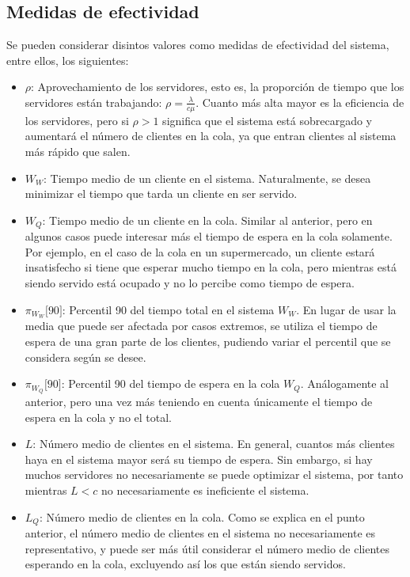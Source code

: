 \documentclass[a4paper,10pt]{scrartcl}
\theoremstyle{definition}
\numberwithin{equation}{section}
\begin{document}
\subsection{Medidas de efectividad}
Se pueden considerar disintos valores como medidas de efectividad del sistema, entre ellos, los siguientes:
\begin{itemize}
\item $\rho$:
  Aprovechamiento de los servidores, esto es, la proporción de tiempo que los servidores están trabajando: 
  $\rho = \frac{\lambda}{c\mu}$. Cuanto más alta mayor es la eficiencia de los servidores, pero 
  si $\rho > 1$ significa que el sistema está sobrecargado y aumentará el número de clientes en la cola, 
  ya que entran clientes al sistema más rápido que salen.
\item $W_W$:
  Tiempo medio de un cliente en el sistema. Naturalmente, se desea minimizar el tiempo que tarda un 
  cliente en ser servido.
\item $W_Q$:
  Tiempo medio de un cliente en la cola. Similar al anterior, pero en algunos casos puede interesar más 
  el tiempo de espera en la cola solamente. Por ejemplo, en el caso de la cola en un supermercado, un 
  cliente estará insatisfecho si tiene que esperar mucho tiempo en la cola, pero mientras está siendo 
  servido está ocupado y no lo percibe como tiempo de espera.
\item $\pi_{W_W} \lbrack 90 \rbrack$:
  Percentil 90 del tiempo total en el sistema $W_W$. En lugar de usar la media que puede ser afectada por 
  casos extremos, se utiliza el tiempo de espera de una gran parte de los clientes, pudiendo variar el 
  percentil que se considera según se desee.
\item $\pi_{W_Q} \lbrack 90 \rbrack$:
  Percentil 90 del tiempo de espera en la cola $W_Q$. Análogamente al anterior, pero una vez más teniendo en
  cuenta únicamente el tiempo de espera en la cola y no el total.
\item $L$:
  Número medio de clientes en el sistema. En general, cuantos más clientes haya en el sistema mayor será su
  tiempo de espera. Sin embargo, si hay muchos servidores no necesariamente se puede optimizar el sistema,
  por tanto mientras $L<c$ no necesariamente es ineficiente el sistema.
\item $L_Q$:
  Número medio de clientes en la cola. Como se explica en el punto anterior, el número medio de clientes en 
  el sistema no necesariamente es representativo, y puede ser más útil considerar el número medio de clientes
  esperando en la cola, excluyendo así los que están siendo servidos.

\end{itemize}
\end{document}
